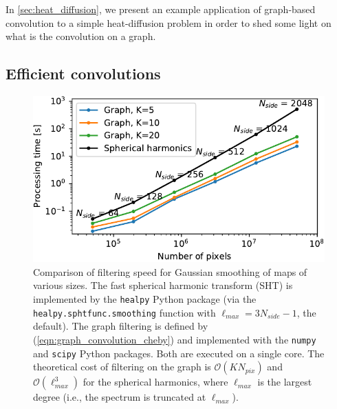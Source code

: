 \documentclass[final,twocolumn,3p,times,authoryear]{elsarticle}
\newcommand{\eqnref}[1]{(\ref{eqn:#1})}
\newcommand{\1}{\b{1}}              %
\newcommand{\0}{\b{0}}              %
\newcommand{\bO}{\mathcal{O}}
\begin{document}
In \ref{sec:heat_diffusion}, we present an example application of graph-based convolution to a simple heat-diffusion problem in order to shed some light on what is the convolution on a graph.



\subsection{Efficient convolutions}
\label{sec:efficient_convolution}

\begin{figure}
    \centering
    \includegraphics[width=\linewidth]{filtering_speed}
    \caption{Comparison of filtering speed for Gaussian smoothing of maps of various sizes.
    The fast spherical harmonic transform (SHT) is implemented by the \texttt{healpy} Python package (via the \texttt{healpy.sphtfunc.smoothing} function with $\ell_{max} = 3 N_{side} - 1$, the default).
    The graph filtering is defined by \eqnref{graph_convolution_cheby} and implemented with the \texttt{numpy} and \texttt{scipy} Python packages.
    Both are executed on a single core.
    The theoretical cost of filtering on the graph is $\bO(K N_{pix})$ and $\bO(\ell_{max}^3)$ for the spherical harmonics, where $\ell_{max}$ is the largest degree (i.e., the spectrum is truncated at $\ell_{max}$).}
    \label{fig:filtering_speed}
\end{figure}
\end{document}
